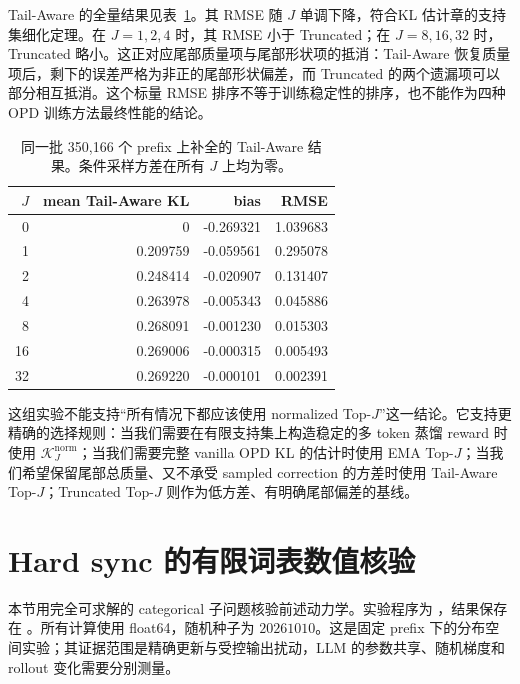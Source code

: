 \documentclass[lang=cn,scheme=chinese,openany]{../book/elegantbook}
\begin{document}
Tail-Aware 的全量结果见表~\ref{tab:qwen-tail-aware}。其 RMSE 随 $J$ 单调下降，符合KL 估计章的支持集细化定理。在 $J=1,2,4$ 时，其 RMSE 小于 Truncated；在 $J=8,16,32$ 时，Truncated 略小。这正对应尾部质量项与尾部形状项的抵消：Tail-Aware 恢复质量项后，剩下的误差严格为非正的尾部形状偏差，而 Truncated 的两个遗漏项可以部分相互抵消。这个标量 RMSE 排序不等于训练稳定性的排序，也不能作为四种 OPD 训练方法最终性能的结论。

\begin{table}[ht]
\centering
\caption{同一批 350,166 个 prefix 上补全的 Tail-Aware 结果。条件采样方差在所有 $J$ 上均为零。}
\label{tab:qwen-tail-aware}
\begin{tabular}{rrrr}
\toprule
$J$ & mean Tail-Aware KL & bias & RMSE\\
\midrule
0 & 0 & -0.269321 & 1.039683\\
1 & 0.209759 & -0.059561 & 0.295078\\
2 & 0.248414 & -0.020907 & 0.131407\\
4 & 0.263978 & -0.005343 & 0.045886\\
8 & 0.268091 & -0.001230 & 0.015303\\
16 & 0.269006 & -0.000315 & 0.005493\\
32 & 0.269220 & -0.000101 & 0.002391\\
\bottomrule
\end{tabular}
\end{table}

这组实验不能支持“所有情况下都应该使用 normalized Top-$J$”这一结论。它支持更精确的选择规则：当我们需要在有限支持集上构造稳定的多 token 蒸馏 reward 时使用 $\mathcal K_J^{\mathrm{norm}}$；当我们需要完整 vanilla OPD KL 的估计时使用 EMA Top-$J$；当我们希望保留尾部总质量、又不承受 sampled correction 的方差时使用 Tail-Aware Top-$J$；Truncated Top-$J$ 则作为低方差、有明确尾部偏差的基线。



\section{Hard sync 的有限词表数值核验}
\label{dyn:sec:hard-sync-experiments}

本节用完全可求解的 categorical 子问题核验前述动力学。实验程序为 ，结果保存在 。所有计算使用 float64，随机种子为 $20261010$。这是固定 prefix 下的分布空间实验；其证据范围是精确更新与受控输出扰动，LLM 的参数共享、随机梯度和 rollout 变化需要分别测量。
\end{document}
